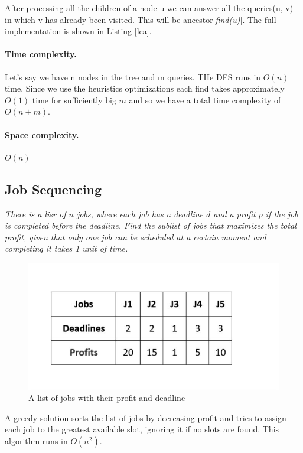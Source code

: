 \documentclass{article}
\begin{document}
After processing all the children of a node u we can answer all the
queries(u, v) in which v has already been visited. This will be ancestor[\emph{find(u)}]. The full implementation
is shown in Listing \ref{lca}.

\paragraph{Time complexity.} Let's say we have n nodes in the tree and m queries.
THe DFS runs in $O(n)$ time. Since we use the heuristics optimizations each find
takes approximately $O(1)$ time for sufficiently big $m$ and so we have
a total time complexity of $O(n+m)$.

\paragraph{Space complexity.} $O(n)$


\subsection{Job Sequencing}
\emph{There is a lisr of $n$ jobs, where each job has a deadline $d$ and a profit $p$ if the job
is completed before the deadline. Find the sublist of jobs that maximizes the total profit, given
that only one job can be scheduled at a certain moment and completing it takes 1 unit of time.}
\begin{figure}[h!]
    \centering
    \includegraphics[scale=0.5]{img/jobs.jpeg}
    \caption{A list of jobs with their profit and deadline}
\end{figure}
\bigskip
A greedy solution \cite{key} sorts the list of jobs by decreasing profit and tries to assign each job to the greatest available slot, ignoring it if no slots
are found. This algorithm runs in $O(n^2)$.
\end{document}
